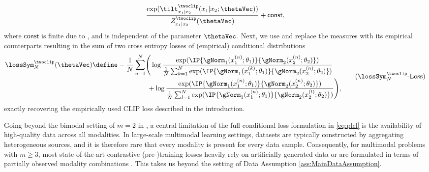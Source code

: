 \documentclass{article}
\begin{document}
\begin{example}[CLIP, $m=2$]
\begin{align*}
{   \frac{\exp(\tilt^{\twoclip}_{x_1\vert x_2}(x_1\vert x_2;\thetaVec))}{ Z^{\twoclip}_{
      x_1\vert x_2}(\thetaVec)}} + \mathsf{const},
 \end{align*}
 where $\mathsf{const}$ is finite due to
 , and is independent of the parameter $\thetaVec$.
 Next, we use  and replace the measures
 with its empirical counterparts resulting in the sum of two cross entropy
 losses of (empirical) conditional distributions
 \begin{align}
  \begin{aligned}
   \lossSym^{\twoclip}_N(\thetaVec)
    & \define - \frac{1}{N}\sum_{n=1}^{N}\Biggr(
   \log \frac{\exp(\IP{\gNorm_1(x_1^{(n)};\theta_1)}{\gNorm_2(x_2^{(n)};\theta_2)})}{
   \frac{1}{N}\sum_{k=1}^{N}
   \exp(\IP{\gNorm_1(x_1^{(k)};\theta_1)}{\gNorm_2(x_2^{(n)};\theta_2)})} \\
    & \qquad\qquad\qquad\qquad +
   \log \frac{\exp(\IP{\gNorm_1(x_1^{(n)};\theta_1)}{\gNorm_2(x_2^{(n)};\theta_2)})}{
   \frac{1}{N}\sum_{l=1}^{N}
   \exp(\IP{\gNorm_1(x_1^{(n)};\theta_1)}{\gNorm_2(x_2^{(l)};\theta_2)})}\Biggl),
  \end{aligned}
  \tag{\ensuremath{\lossSym^{\twoclip}_N}-Loss}
  \label{eq:BiModalClipLoss-Empirical}
 \end{align}
 exactly recovering the empirically used CLIP loss described in the introduction.
\end{example}

Going beyond the bimodal setting of $m=2$ in , a central
limitation of the full conditional loss formulation in \eqref{eq:plcl} is
the availability of high-quality data across all modalities. In large-scale
multimodal learning settings, datasets are typically constructed by
aggregating heterogeneous sources, and it is therefore rare that every
modality is present for every data sample. Consequently, for multimodal
problems with $m \ge 3$, most state-of-the-art contrastive (pre-)training
losses heavily rely on artificially generated data or are formulated in
terms of partially observed modality combinations
\citep{zamirTaskonomyDisentanglingTask2018,
 eftekharOmnidataScalablePipeline2021,
 ghiasiMultiTaskSelfTrainingLearning2021,
 robertsHypersimPhotorealisticSynthetic2021,
 bachmannMultiMAEMultimodalMultitask2022, mizrahi4MMassivelyMultimodal2023,
 bachmann4M21AnytoAnyVision2024}. This takes us beyond the setting of Data
Assumption \ref{ass:MainDataAssumption}.
\end{document}
